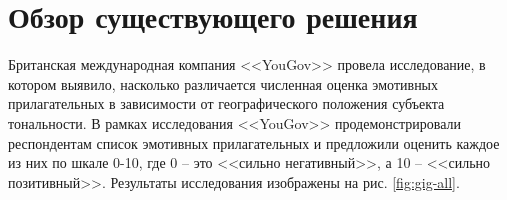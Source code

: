 


\section{Обзор существующего решения}
Британская международная компания <<YouGov>> провела исследование, в котором выявило, насколько различается численная оценка эмотивных прилагательных в зависимости от географического положения субъекта тональности. \cite{goodisgood} 
В рамках исследования <<YouGov>> продемонстрировали респондентам список эмотивных прилагательных и предложили оценить каждое из них по шкале 0-10, где 0 -- это <<сильно негативный>>, а 10 -- <<сильно позитивный>>. Результаты исследования изображены на рис. \ref{fig:gig-all}.

